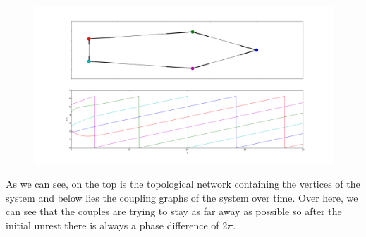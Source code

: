 \begin{figure}[h!]
\centering
\includegraphics[width=0.8\linewidth]{imgs/examplefigure}
\caption{}
\end{figure}

As we can see, on the top is the topological network containing the vertices of the system and below lies the coupling graphs of the system over time. Over here, we can see that the couples are trying to stay as far away as possible so after the initial unrest there is always a phase difference of 2$\pi$. 


